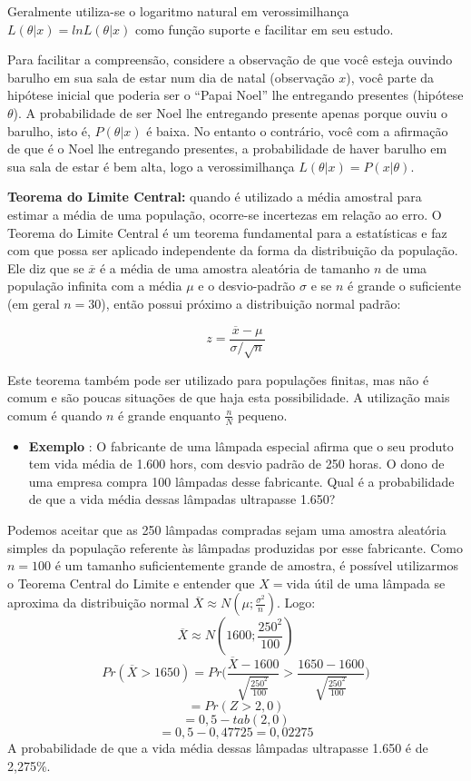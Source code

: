 \documentclass[
  openany]{book}
\providecommand{\tightlist}{%
  \setlength{\itemsep}{0pt}\setlength{\parskip}{0pt}}
\begin{document}
Geralmente utiliza-se o logaritmo natural em verossimilhança \(L(\theta |x)=ln L(\theta|x)\) como função suporte e facilitar em seu estudo.

Para facilitar a compreensão, considere a observação de que você esteja ouvindo barulho em sua sala de estar num dia de natal (observação \(x\)), você parte da hipótese inicial que poderia ser o ``Papai Noel'' lhe entregando presentes (hipótese \(\theta\)). A probabilidade de ser Noel lhe entregando presente apenas porque ouviu o barulho, isto é, \(P(\theta|x)\) é baixa. No entanto o contrário, você com a afirmação de que é o Noel lhe entregando presentes, a probabilidade de haver barulho em sua sala de estar é bem alta, logo a verossimilhança \(L(\theta|x)=P(x|\theta)\).

\textbf{Teorema do Limite Central:} quando é utilizado a média amostral para estimar a média de uma população, ocorre-se incertezas em relação ao erro. O Teorema do Limite Central é um teorema fundamental para a estatísticas e faz com que possa ser aplicado independente da forma da distribuição da população. Ele diz que se \(\overline{x}\) é a média de uma amostra aleatória de tamanho \(n\) de uma população infinita com a média \(\mu\) e o desvio-padrão \(\sigma\) e se \(n\) é grande o suficiente (em geral \(n=30\)), então possui próximo a distribuição normal padrão:

\begin{equation} 
 z=\frac{\overline{x}-\mu}{\sigma / \sqrt{n}}
  \label{eq:teoremacentralimite}
\end{equation}

Este teorema também pode ser utilizado para populações finitas, mas não é comum e são poucas situações de que haja esta possibilidade. A utilização mais comum é quando \(n\) é grande enquanto \(\frac{n}{N}\) pequeno.

\begin{itemize}
\tightlist
\item
  \textbf{Exemplo} \citep{fariaestatistic}: O fabricante de uma lâmpada especial afirma que o seu produto tem vida média de 1.600 hors, com desvio padrão de 250 horas. O dono de uma empresa compra 100 lâmpadas desse fabricante. Qual é a probabilidade de que a vida média dessas lâmpadas ultrapasse 1.650?
\end{itemize}

Podemos aceitar que as 250 lâmpadas compradas sejam uma amostra aleatória simples da população referente às lâmpadas produzidas por esse fabricante. Como \(n=100\) é um tamanho suficientemente grande de amostra, é possível utilizarmos o Teorema Central do Limite e entender que \(X=\)vida útil de uma lâmpada se aproxima da distribuição normal \(\overline{X}\approx N(\mu;\frac{\sigma^2}{n})\). Logo:
\[\overline{X}\approx N(1600;\frac{250^2}{100})\]
\[Pr(\overline{X}>1650)=Pr\bigg( \frac{\overline{X}-1600}{\sqrt{\frac{250^2}{100}}}>\frac{1650-1600}{\sqrt{\frac{250^2}{100}}} \bigg)\]
\[=Pr(Z>2,0)\]
\[=0,5-tab(2,0)\]
\[=0,5-0,47725=0,02275\]
A probabilidade de que a vida média dessas lâmpadas ultrapasse 1.650 é de 2,275\%.
\end{document}
